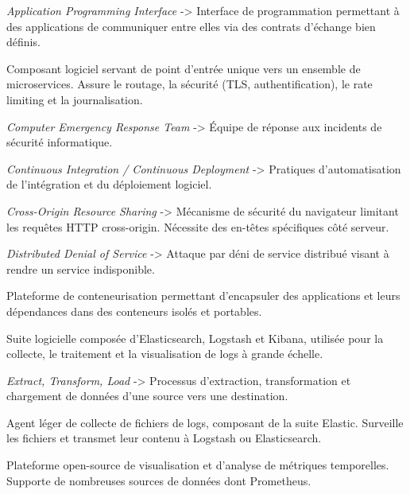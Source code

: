 \documentclass[12pt, a4paper]{report}
\begin{document}
\begin{description}[leftmargin=3.5cm, style=nextline]

  \item[API] \textit{Application Programming Interface} -> Interface de programmation permettant à des applications de communiquer entre elles via des contrats d'échange bien définis.

  \item[API Gateway] Composant logiciel servant de point d'entrée unique vers un ensemble de microservices. Assure le routage, la sécurité (TLS, authentification), le rate limiting et la journalisation.

  \item[CERT] \textit{Computer Emergency Response Team} -> Équipe de réponse aux incidents de sécurité informatique.

  \item[CI/CD] \textit{Continuous Integration / Continuous Deployment} -> Pratiques d'automatisation de l'intégration et du déploiement logiciel.

  \item[CORS] \textit{Cross-Origin Resource Sharing} -> Mécanisme de sécurité du navigateur limitant les requêtes HTTP cross-origin. Nécessite des en-têtes spécifiques côté serveur.

  \item[DDoS] \textit{Distributed Denial of Service} -> Attaque par déni de service distribué visant à rendre un service indisponible.

  \item[Docker] Plateforme de conteneurisation permettant d'encapsuler des applications et leurs dépendances dans des conteneurs isolés et portables.

  \item[ELK Stack] Suite logicielle composée d'Elasticsearch, Logstash et Kibana, utilisée pour la collecte, le traitement et la visualisation de logs à grande échelle.

  \item[ETL] \textit{Extract, Transform, Load} -> Processus d'extraction, transformation et chargement de données d'une source vers une destination.

  \item[Filebeat] Agent léger de collecte de fichiers de logs, composant de la suite Elastic. Surveille les fichiers et transmet leur contenu à Logstash ou Elasticsearch.

  \item[Grafana] Plateforme open-source de visualisation et d'analyse de métriques temporelles. Supporte de nombreuses sources de données dont Prometheus.


\end{description}
\end{document}
